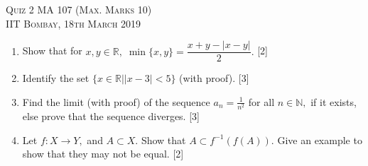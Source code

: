 \documentclass{article}
\begin{document}
\begin{center}
    \textsc{Quiz 2 MA 107 (Max. Marks 10)}\\
    \textsc{IIT Bombay, 18th March 2019}
\end{center}
\begin{enumerate}[label = (\arabic*)]
    \item Show that for $x, y \in \mathbb{R},\; \min\{x, y\} = \dfrac{x+y-|x-y|}{2}.$ \hfill [2]
    \item Identify the set $\{x \in \mathbb{R} | |x - 3| < 5\}$ (with proof). \hfill [3]
    \item Find the limit (with proof) of the sequence $a_n = \frac{1}{n^2}$ for all $n \in \mathbb{N},$ if it exists, else prove that the sequence diverges. \hfill [3]
    \item Let $f:X\to Y,$ and $A \subset X.$ Show that $A \subset f^{-1}(f(A)).$ Give an example to show that they may not be equal. \hfill [2]
\end{enumerate}
\end{document}
